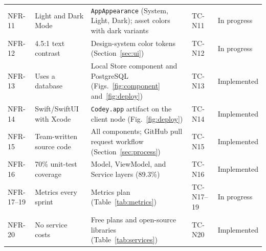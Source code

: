 \documentclass[12pt,letterpaper]{article}
\begin{document}
\begin{xltabular}{\textwidth}{@{}l L{3.2cm} Y l l@{}}
NFR-11 & Light and Dark Mode & \texttt{AppAppearance} (System, Light, Dark); asset colors with dark variants & TC-N11 & In progress \\
NFR-12 & 4.5:1 text contrast & Design-system color tokens (Section~\ref{sec:ui}) & TC-N12 & In progress \\
NFR-13 & Uses a database & Local Store component and PostgreSQL (Figs.~\ref{fig:component} and~\ref{fig:deploy}) & TC-N13 & Implemented \\
NFR-14 & Swift/SwiftUI with Xcode & \texttt{Codey.app} artifact on the client node (Fig.~\ref{fig:deploy}) & TC-N14 & Implemented \\
NFR-15 & Team-written source code & All components; GitHub pull request workflow (Section~\ref{sec:process}) & TC-N15 & Implemented \\
NFR-16 & 70\% unit-test coverage & Model, ViewModel, and Service layers (89.3\%) & TC-N16 & Implemented \\
NFR-17--19 & Metrics every sprint & Metrics plan (Table~\ref{tab:metrics}) & TC-N17--19 & In progress \\
NFR-20 & No service costs & Free plans and open-source libraries (Table~\ref{tab:services}) & TC-N20 & Implemented \\
\end{xltabular}
\end{document}

